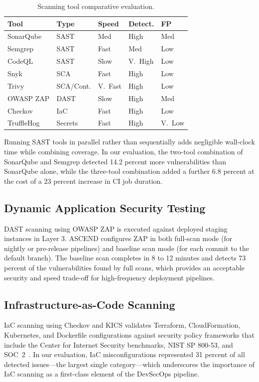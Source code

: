 \documentclass{ieeeaccess}
\begin{document}
\begin{table}[!t]
\caption{Scanning tool comparative evaluation.}
\label{tab:tool-eval}
\centering
\begin{tabular}{lllll}
\hline
\textbf{Tool} & \textbf{Type} & \textbf{Speed} & \textbf{Detect.} & \textbf{FP} \\
\hline
SonarQube  & SAST       & Med    & High    & Med  \\
Semgrep    & SAST       & Fast   & Med     & Low  \\
CodeQL     & SAST       & Slow   & V.~High & Low  \\
Snyk       & SCA        & Fast   & High    & Low  \\
Trivy      & SCA/Cont.  & V.~Fast & High   & Low  \\
OWASP ZAP  & DAST       & Slow   & High    & Med  \\
Checkov    & IaC        & Fast   & High    & Low  \\
TruffleHog & Secrets    & Fast   & High    & V.~Low \\
\hline
\end{tabular}
\end{table}

Running SAST tools in parallel rather than sequentially adds negligible wall-clock time while combining coverage. In our evaluation, the two-tool combination of SonarQube and Semgrep detected 14.2 percent more vulnerabilities than SonarQube alone, while the three-tool combination added a further 6.8 percent at the cost of a 23 percent increase in CI job duration.

\subsection{Dynamic Application Security Testing}
DAST scanning using OWASP ZAP is executed against deployed staging instances in Layer 3. ASCEND configures ZAP in both full-scan mode (for nightly or pre-release pipelines) and baseline scan mode (for each commit to the default branch). The baseline scan completes in 8 to 12 minutes and detects 73 percent of the vulnerabilities found by full scans, which provides an acceptable security and speed trade-off for high-frequency deployment pipelines.

\subsection{Infrastructure-as-Code Scanning}
IaC scanning using Checkov and KICS validates Terraform, CloudFormation, Kubernetes, and Dockerfile configurations against security policy frameworks that include the Center for Internet Security benchmarks, NIST SP 800-53, and SOC~2~\cite{souppaya2022ssdf}. In our evaluation, IaC misconfigurations represented 31 percent of all detected issues---the largest single category---which underscores the importance of IaC scanning as a first-class element of the DevSecOps pipeline.
\end{document}
